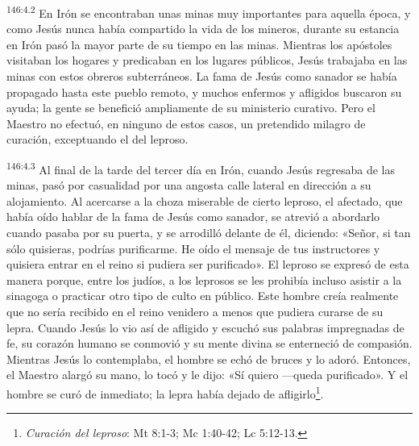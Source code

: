 \par
\textsuperscript{146:4.2} En Irón se encontraban unas minas muy importantes para aquella época, y como Jesús nunca había compartido la vida de los mineros, durante su estancia en Irón pasó la mayor parte de su tiempo en las minas. Mientras los apóstoles visitaban los hogares y predicaban en los lugares públicos, Jesús trabajaba en las minas con estos obreros subterráneos. La fama de Jesús como sanador se había propagado hasta este pueblo remoto, y muchos enfermos y afligidos buscaron su ayuda; la gente se benefició ampliamente de su ministerio curativo. Pero el Maestro no efectuó, en ninguno de estos casos, un pretendido milagro de curación, exceptuando el del leproso.

\par
\textsuperscript{146:4.3} Al final de la tarde del tercer día en Irón, cuando Jesús regresaba de las minas, pasó por casualidad por una angosta calle lateral en dirección a su alojamiento. Al acercarse a la choza miserable de cierto leproso, el afectado, que había oído hablar de la fama de Jesús como sanador, se atrevió a abordarlo cuando pasaba por su puerta, y se arrodilló delante de él, diciendo: «Señor, si tan sólo quisieras, podrías purificarme. He oído el mensaje de tus instructores y quisiera entrar en el reino si pudiera ser purificado». El leproso se expresó de esta manera porque, entre los judíos, a los leprosos se les prohibía incluso asistir a la sinagoga o practicar otro tipo de culto en público. Este hombre creía realmente que no sería recibido en el reino venidero a menos que pudiera curarse de su lepra. Cuando Jesús lo vio así de afligido y escuchó sus palabras impregnadas de fe, su corazón humano se conmovió y su mente divina se enterneció de compasión. Mientras Jesús lo contemplaba, el hombre se echó de bruces y lo adoró. Entonces, el Maestro alargó su mano, lo tocó y le dijo: «Sí quiero ---queda purificado». Y el hombre se curó de inmediato; la lepra había dejado de afligirlo\footnote{\textit{Curación del leproso}: Mt 8:1-3; Mc 1:40-42; Lc 5:12-13.}.

